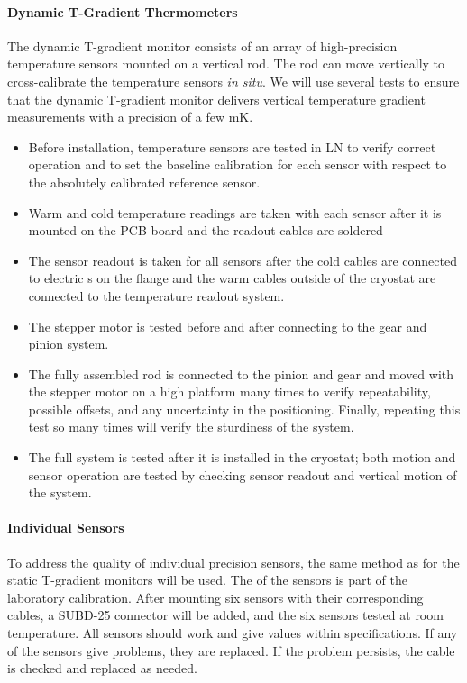\paragraph{Dynamic T-Gradient Thermometers}
\label{sec:fdgen-slow-cryo-qc-thdy}

The dynamic T-gradient monitor consists of an array of high-precision temperature sensors mounted on a vertical rod. The rod can move vertically to cross-calibrate the temperature sensors {\em in situ}. We will use several tests to ensure that the dynamic T-gradient monitor delivers vertical temperature gradient measurements with a precision of a few \si{mK}.

\begin{itemize}
\item
Before installation, temperature sensors are tested in LN to verify correct operation and to set the baseline calibration for each sensor with respect to the absolutely calibrated reference sensor. 
\item
Warm and cold temperature readings are taken with each sensor after it is mounted on the PCB board and the readout cables are soldered %
\item
The sensor readout is taken for all sensors after the cold cables are connected to electric \fdth{}s on the flange and the warm cables outside of the cryostat are connected to the temperature readout system.
\item 
The stepper motor is tested before and after connecting to the gear and pinion system.
\item
The fully assembled rod is connected to the pinion and gear and moved with the stepper motor on a high platform many times to verify repeatability, possible offsets, and any uncertainty in the positioning. Finally, repeating this test so many times will verify the sturdiness of the system.
\item
The full system is tested after it is installed in the cryostat; both motion and sensor operation are tested by checking %
sensor readout and vertical motion of the system.
\end{itemize} 

\paragraph{Individual Sensors}
\label{sec:fdgen-slow-cryo-qc-is}

To address the quality of individual precision sensors, the same method as for the static T-gradient monitors will be used.
The  of the sensors is part of the laboratory calibration. After mounting six sensors with their corresponding cables, a
SUBD-25 connector will be added, and the six sensors tested at room temperature. All sensors should work and give values within specifications.  
If any of the sensors give problems, they are replaced.  If the problem persists, the cable is checked and replaced as needed.

